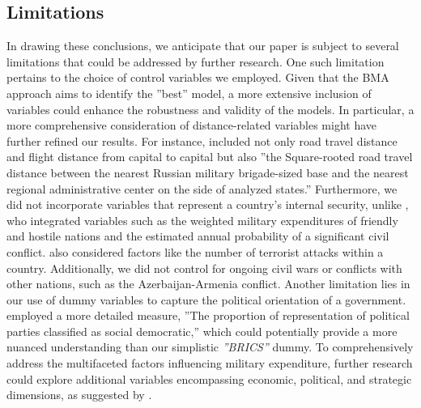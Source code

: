 \documentclass[12pt,a4paper]{article}
\begin{document}
\subsection{Limitations}
In drawing these conclusions, we anticipate that our paper is subject to several limitations that could be addressed by further research. One such limitation pertains to the choice of control variables we employed. Given that the BMA approach aims to identify the ''best'' model, a more extensive inclusion of variables could enhance the robustness and validity of the models. In particular, a more comprehensive consideration of distance-related variables might have further refined our results. For instance, \citet{kofrovn2023} included not only road travel distance and flight distance from capital to capital but also ''the Square-rooted road travel distance between the nearest Russian military brigade-sized base and the nearest regional administrative center on the side of analyzed states.'' Furthermore, we did not incorporate variables that represent a country's internal security, unlike \citet{nordhaus2012}, who integrated variables such as the weighted military expenditures of friendly and hostile nations and the estimated annual probability of a significant civil conflict. \citet{kofrovn2023} also considered factors like the number of terrorist attacks within a country. Additionally, we did not control for ongoing civil wars or conflicts with other nations, such as the Azerbaijan-Armenia conflict. Another limitation lies in our use of dummy variables to capture the political orientation of a government. \citet{kofrovn2023} employed a more detailed measure, ''The proportion of representation of political parties classified as social democratic,'' which could potentially provide a more nuanced understanding than our simplistic \textit{''BRICS''} dummy. To comprehensively address the multifaceted factors influencing military expenditure, further research could explore additional variables encompassing economic, political, and strategic dimensions, as suggested by \citet{nikolaidou2008}.
\end{document}
